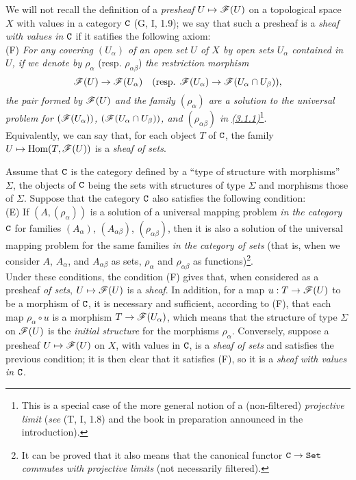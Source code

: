 \begin{env}[3.1.2]
\label{env-0.3.1.2}
We will not recall the definition of a {\em presheaf} $U\mapsto\mathscr{F}(U)$ on a
topological space $X$ with values in a category $\mathtt{C}$ (G, I, 1.9); we say that
such a presheaf is a {\em sheaf with values in} $\mathtt{C}$ if it satifies the
following axiom:\\

(F) {\em For any covering $(U_\alpha)$ of an open set $U$ of $X$ by open sets
    $U_\alpha$ contained in $U$, if we denote by $\rho_\alpha$}
    (resp. $\rho_{\alpha\beta}$) {\em the restriction morphism}
    \[
      \mathscr{F}(U)\to\mathscr{F}(U_\alpha)
      \quad(\text{resp. }\mathscr{F}(U_\alpha)\to\mathscr{F}(U_\alpha\cap U_\beta)),
    \]
    {\em the pair formed by $\mathscr{F}(U)$ and the family $(\rho_\alpha)$ are a
    solution to the universal problem for $(\mathscr{F}(U_\alpha))$,
    $(\mathscr{F}(U_\alpha\cap U_\beta))$, and $(\rho_{\alpha\beta})$ in
    \hyperref[env-0.3.1.1]{(3.1.1)}}\footnote{This is a special case of the more general
    notion of a (non-filtered) {\em projective limit} ({\em see} (T, I, 1.8)
    and the book in preparation announced in the introduction).}.\\

Equivalently, we can say that, for each object $T$ of $\mathtt{C}$, the family
$U\mapsto{\mathop{\mathrm{Hom}}\nolimits}(T,\mathscr{F}(U))$ is a {\em sheaf of sets}.
\end{env}

\begin{env}[3.1.3]
\label{env-0.3.1.3}
Assume that $\mathtt{C}$ is the category defined by a
``type of structure with morphisms'' $\Sigma$, the objects of $\mathtt{C}$ being the
sets with structures of type $\Sigma$ and morphisms those of $\Sigma$. Suppose
that the category $\mathtt{C}$ also satisfies the following condition:\\

(E) If $(A,(\rho_\alpha))$ is a solution of a universal mapping problem {\em in
    the category $\mathtt{C}$} for families $(A_\alpha)$, $(A_{\alpha\beta})$,
    $(\rho_{\alpha\beta})$, then it is also a solution of the universal mapping
    problem for the same families {\em in the category of sets} (that is, when
    we consider $A$, $A_\alpha$, and $A_{\alpha\beta}$ as sets, $\rho_\alpha$
    and $\rho_{\alpha\beta}$ as functions)\footnote{It can be proved that it
    also means that the canonical functor $\mathtt{C}\to\mathtt{Set}$ {\em commutes with
    projective limits} (not necessarily filtered).}.\\

Under these conditions, the condition (F) gives that, when considered as a
presheaf {\em of sets}, $U\mapsto\mathscr{F}(U)$ is a {\em sheaf}. In addition, for
a map $u:T\to\mathscr{F}(U)$ to be a morphism of $\mathtt{C}$, it is necessary and
sufficient, according to (F), that each map $\rho_\alpha\circ u$ is a morphism
$T\to\mathscr{F}(U_\alpha)$, which means that the structure of type $\Sigma$ on
$\mathscr{F}(U)$ is the {\em initial structure} for the morphisms $\rho_\alpha$.
Conversely, suppose a presheaf $U\mapsto\mathscr{F}(U)$ on $X$, with values in $\mathtt{C}$,
is a {\em sheaf of sets} and satisfies the previous condition; it is then clear
that it satisfies (F), so it is a {\em sheaf with values in $\mathtt{C}$}.
\end{env}

